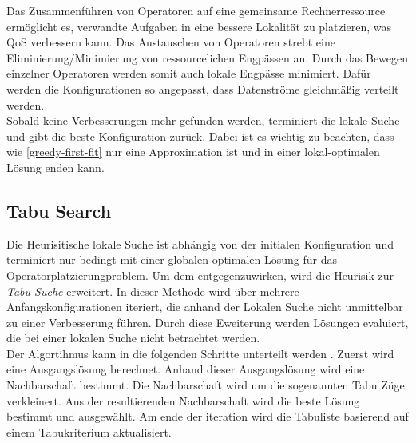 \documentclass{article}
\begin{document}
Das Zusammenführen von Operatoren auf eine gemeinsame Rechnerressource ermöglicht es, 
verwandte Aufgaben in eine bessere Lokalität zu platzieren, was QoS verbessern kann. 
Das Austauschen von Operatoren strebt eine Eliminierung/Minimierung von ressourcelichen Engpässen an. 
Durch das Bewegen einzelner Operatoren werden somit auch lokale Engpässe minimiert.
Dafür werden die Konfigurationen so angepasst, dass  Datenströme gleichmäßig verteilt werden.   \\
Sobald keine Verbesserungen mehr gefunden werden, terminiert die lokale Suche und gibt die beste Konfiguration zurück. 
Dabei ist es wichtig zu beachten, dass wie \ref{greedy-first-fit} nur eine Approximation ist und in einer lokal-optimalen Lösung enden kann. 

 


\subsection{Tabu Search}
Die Heurisitische lokale Suche ist abhängig von der initialen Konfiguration und terminiert nur bedingt mit einer globalen optimalen Lösung für das Operatorplatzierungproblem. 
Um dem entgegenzuwirken, wird die Heurisik zur \textit{Tabu Suche} \cite{glover-tabu-search} erweitert.  In dieser Methode wird über mehrere Anfangskonfigurationen iteriert, 
die anhand der Lokalen Suche nicht unmittelbar zu einer Verbesserung führen. Durch diese Eweiterung
werden Lösungen evaluiert, die bei einer lokalen Suche nicht betrachtet werden. \\
Der Algortihmus kann in die folgenden Schritte unterteilt werden \cite{glover-tabu-search-tutorial}. Zuerst wird eine Ausgangslösung berechnet.
Anhand dieser Ausgangslösung wird eine Nachbarschaft bestimmt. Die Nachbarschaft wird um die sogenannten Tabu Züge verkleinert. 
Aus der resultierenden Nachbarschaft wird die beste Lösung bestimmt und ausgewählt. Am ende der iteration wird die Tabuliste basierend auf einem Tabukriterium aktualisiert.
\end{document}
